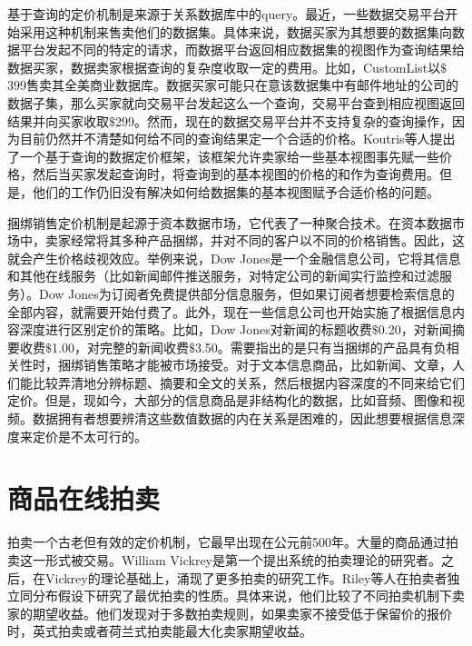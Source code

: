 基于查询的定价机制是来源于关系数据库中的query。最近，一些数据交易平台开始采用这种机制来售卖他们的数据集。具体来说，数据买家为其想要的数据集向数据平台发起不同的特定的请求，而数据平台返回相应数据集的视图作为查询结果给数据买家，数据卖家根据查询的复杂度收取一定的费用。比如，CustomList\cite{customlists}以$\$$399售卖其全美商业数据库。数据买家可能只在意该数据集中有邮件地址的公司的数据子集，那么买家就向交易平台发起这么一个查询，交易平台查到相应视图返回结果并向买家收取$\$$299。然而，现在的数据交易平台并不支持复杂的查询操作，因为目前仍然并不清楚如何给不同的查询结果定一个合适的价格。Koutris\cite{koutris2015query}等人提出了一个基于查询的数据定价框架，该框架允许卖家给一些基本视图事先赋一些价格，然后当买家发起查询时，将查询到的基本视图的价格的和作为查询费用。但是，他们的工作仍旧没有解决如何给数据集的基本视图赋予合适价格的问题。

捆绑销售定价机制是起源于资本数据市场，它代表了一种聚合技术\cite{bakos2001aggregation}。在资本数据市场中，卖家经常将其多种产品捆绑，并对不同的客户以不同的价格销售。因此，这就会产生价格歧视效应\cite{bakos1999bundling}。举例来说，Dow Jones是一个金融信息公司，它将其信息和其他在线服务（比如新闻邮件推送服务，对特定公司的新闻实行监控和过滤服务）。Dow Jones为订阅者免费提供部分信息服务，但如果订阅者想要检索信息的全部内容，就需要开始付费了。此外，现在一些信息公司也开始实施了根据信息内容深度进行区别定价的策略。比如，Dow Jones对新闻的标题收费$\$$0.20，对新闻摘要收费$\$$1.00，对完整的新闻收费$\$$3.50。需要指出的是只有当捆绑的产品具有负相关性时，捆绑销售策略才能被市场接受。对于文本信息商品，比如新闻、文章，人们能比较弄清地分辨标题、摘要和全文的关系，然后根据内容深度的不同来给它们定价。但是，现如今，大部分的信息商品是非结构化的数据，比如音频、图像和视频。数据拥有者想要辨清这些数值数据的内在关系是困难的，因此想要根据信息深度来定价是不太可行的。

 \section{商品在线拍卖}

拍卖一个古老但有效的定价机制，它最早出现在公元前500年。大量的商品通过拍卖这一形式被交易。William Vickrey是第一个提出系统的拍卖理论的研究者\cite{Vickrey1961Counterspeculation}。之后，在Vickrey的理论基础上，涌现了更多拍卖的研究工作\cite{Milgrom1989Auctions,Milgrom1982A,Riley1981Optimal}。Riley等人\cite{Riley1981Optimal}在拍卖者独立同分布假设下研究了最优拍卖的性质。具体来说，他们比较了不同拍卖机制下卖家的期望收益。他们发现对于多数拍卖规则，如果卖家不接受低于保留价的报价时，英式拍卖或者荷兰式拍卖能最大化卖家期望收益。

